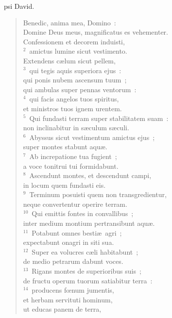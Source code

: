 \bchapter
{}psi David. \begin{flushleft}\begin{verse}\vspace{6pt}Benedic, anima mea, Domino~:\\ Domine Deus meus, magnificatus es vehementer.\\ Confessionem et decorem induisti,\\
${}^{2}$~amictus lumine sicut vestimento.\\ Extendens c\ae lum sicut pellem,\\
${}^{3}$~qui tegis aquis superiora ejus~:\\ qui ponis nubem ascensum tuum~;\\ qui ambulas super pennas ventorum~:\\
${}^{4}$~qui facis angelos tuos spiritus,\\ et ministros tuos ignem urentem.\\
${}^{5}$~Qui fundasti terram super stabilitatem suam~:\\ non inclinabitur in s\ae culum s\ae culi.\\
${}^{6}$~Abyssus sicut vestimentum amictus ejus~;\\ super montes stabunt aqu\ae .\\
${}^{7}$~Ab increpatione tua fugient~;\\ a voce tonitrui tui formidabunt.\\
${}^{8}$~Ascendunt montes, et descendunt campi,\\ in locum quem fundasti eis.\\
${}^{9}$~Terminum posuisti quem non transgredientur,\\ neque convertentur operire terram.\\
${}^{10}$~Qui emittis fontes in convallibus~;\\ inter medium montium pertransibunt aqu\ae .\\
${}^{11}$~Potabunt omnes besti\ae\ agri~;\\ expectabunt onagri in siti sua.\\
${}^{12}$~Super ea volucres c\ae li habitabunt~;\\ de medio petrarum dabunt voces.\\
${}^{13}$~Rigans montes de superioribus suis~;\\ de fructu operum tuorum satiabitur terra~:\\
${}^{14}$~producens fœnum jumentis,\\ et herbam servituti hominum,\\ ut educas panem de terra,\\

\end{verse}
\end{flushleft}
